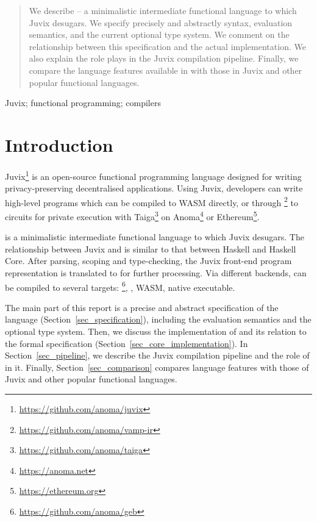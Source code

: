 \documentclass[final]{msc}
\begin{document}


\begin{abstract}
We describe \JuvixCore{} -- a minimalistic intermediate functional language to which Juvix desugars. We specify precisely and abstractly \JuvixCore{} syntax, evaluation semantics, and the current optional type system. We comment on the relationship between this specification and the actual implementation. We also explain the role \JuvixCore{} plays in the Juvix compilation pipeline. Finally, we compare the language features available in \JuvixCore{} with those in Juvix and other popular functional languages.
\end{abstract}

\begin{keywords}
Juvix; functional programming; compilers
\end{keywords}
\maketitle

\section{Introduction}

Juvix\footnote{\url{https://github.com/anoma/juvix}} is an open-source functional programming language designed for writing privacy-preserving decentralised applications. Using Juvix, developers can write high-level programs which can be compiled to WASM directly, or through \VampIR\footnote{\url{https://github.com/anoma/vamp-ir}} to circuits for private execution with Taiga\footnote{\url{https://github.com/anoma/taiga}} on Anoma\footnote{\url{https://anoma.net}} or Ethereum\footnote{\url{https://ethereum.org}}.

\JuvixCore{} is a minimalistic intermediate functional language to which Juvix desugars. The relationship between Juvix and \JuvixCore{} is similar to that between Haskell and Haskell Core. After parsing, scoping and type-checking, the Juvix front-end program representation is translated to \JuvixCore{} for further processing. Via different backends, \JuvixCore{} can be compiled to several targets: \Geb{}\footnote{\url{https://github.com/anoma/geb}}, \VampIR, WASM, native executable.

The main part of this report is a precise and abstract specification of the \JuvixCore{} language (Section~\ref{sec_specification}), including the evaluation semantics and the optional type system. Then, we discuss the implementation of \JuvixCore{} and its relation to the formal specification
(Section~\ref{sec_core_implementation}). In Section~\ref{sec_pipeline}, we describe the Juvix compilation pipeline and the role of \JuvixCore{} in it. Finally, Section~\ref{sec_comparison} compares \JuvixCore{} language features with those of Juvix and other popular functional languages.
\end{document}
